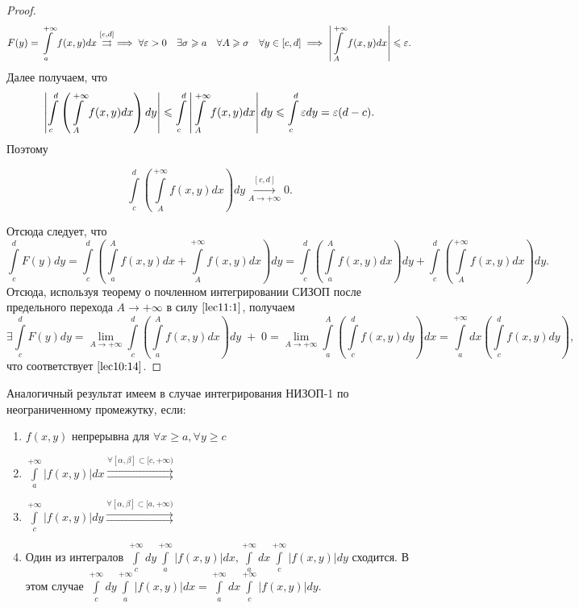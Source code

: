 \documentclass[../../main.tex]{subfiles}
\begin{document}
\begin{proof}
	\[F(y) = \int\limits_a^{+\infty} f(x, y)dx \overset{[c, d]}\rightrightarrows 
	\implies
	\forall \varepsilon > 0 \quad \exists \sigma \geqslant a \quad \forall A \geqslant \sigma 
	\quad \forall y \in [c, d] \implies \left|\int\limits_A^{+\infty}f(x, y) dx 
	\right| \leqslant \varepsilon.\]
	Далее получаем, что 
	\[ \left| \int\limits_c^d\left(\int\limits_A^{+\infty}f(x, y)dx\right) 
	dy\right| 
	\leqslant \int\limits_c^d\left|\int\limits_A^{+\infty}f(x, y)dx\right| dy
	\leqslant \int\limits_c^d \varepsilon dy = \varepsilon(d - c).\]
	Поэтому 
	
	\begin{equation} \label{lec11:1}
		\int\limits_c^d \left( \int\limits_A^{+\infty} f(x, y) dx \right) dy 
		\overset{[c, d]}{\underset{A \rightarrow +\infty}\longrightarrow} 0.
	\end{equation}
	
	Отсюда следует, что
	\[
	\int\limits_c^d F(y)dy = \int\limits_c^d \left( \int\limits_a^A f(x, y)dx + 
	\int\limits_A^{+\infty} f(x, y) dx \right) dy = \int\limits_c^d \left( 
	\int\limits_a^A f(x, y) dx \right) dy + \int\limits_c^d \left( 
	\int\limits_A^{+\infty} f(x, y) dx \right) dy.
	\]
	Отсюда, используя теорему о почленном интегрировании СИЗОП после предельного 
	перехода $A \longrightarrow +\infty$ в силу $\eqref{lec11:1}$, получаем 
	\[
	\exists \int\limits_c^d F(y) dy = \lim_{A \rightarrow +\infty} 
	\int\limits_c^d \left( \int\limits_a^A f(x, y) dx \right) dy \; + \; 0 
	= \lim_{A \rightarrow +\infty} \int\limits_a^A \left( \int\limits_c^d f(x, y) 
	dy \right) dx 
	= \int\limits_a^{+\infty} dx \left( \int\limits_c^d f(x, y) dy \right),
	\] что соответствует $\eqref{lec10:14}$.
\end{proof}

\begin{rem}
	Аналогичный результат имеем в случае интегрирования НИЗОП-1 по 
	неограниченному промежутку, если:
	\begin{enumerate}
		\item $\displaystyle f(x, y)$ непрерывна для $\forall x \geq a, \forall y 
		\geq c$
		\item $\displaystyle \int\limits_a^{+\infty} \left| f(x, y) \right| dx 
		\overset{\forall [\alpha, \beta] \subset [c, +\infty) }\rightrightarrows$
		\item $\displaystyle \int\limits_c^{+\infty} \left| f(x, y) \right| dy 
		\overset{\forall [\alpha, \beta] \subset [a, +\infty) }\rightrightarrows$
		\item Один из интегралов $\displaystyle \int\limits_c^{+\infty} dy 
		\int\limits_a^{+\infty} \left|f(x, y)\right| dx,
		\int\limits_a^{+\infty} dx \int\limits_c^{+\infty} \left|f(x, y)\right| dy$
		сходится. В этом случае
		$\displaystyle \int\limits_c^{+\infty} dy \int\limits_a^{+\infty} \left|f(x, 
		y)\right| dx = \int\limits_a^{+\infty} dx \int\limits_c^{+\infty} \left|f(x, 
		y)\right| dy$.
	\end{enumerate}
\end{rem}
\end{document}
